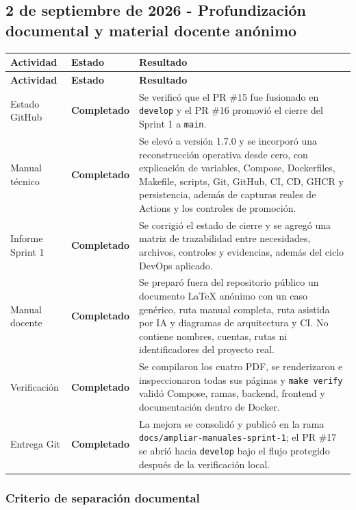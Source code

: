 \documentclass[11pt,letterpaper]{article}
\newcommand{\statusok}{\textcolor{deepgreen}{\textbf{Completado}}}
\newcommand{\file}[1]{\texttt{#1}}
\begin{document}
\subsection{2 de septiembre de 2026 - Profundización documental y material docente anónimo}

\begin{longtable}{@{}p{}p{}p{}@{}}
  \toprule
  \textbf{Actividad} & \textbf{Estado} & \textbf{Resultado} \\
  \midrule
  \endfirsthead
  \toprule
  \textbf{Actividad} & \textbf{Estado} & \textbf{Resultado} \\
  \midrule
  \endhead
  Estado GitHub & \statusok & Se verificó que el PR \#15 fue fusionado en \file{develop} y el PR \#16 promovió el cierre del Sprint 1 a \file{main}. \\
  Manual técnico & \statusok & Se elevó a versión 1.7.0 y se incorporó una reconstrucción operativa desde cero, con explicación de variables, Compose, Dockerfiles, Makefile, scripts, Git, GitHub, CI, CD, GHCR y persistencia, además de capturas reales de Actions y los controles de promoción. \\
  Informe Sprint 1 & \statusok & Se corrigió el estado de cierre y se agregó una matriz de trazabilidad entre necesidades, archivos, controles y evidencias, además del ciclo DevOps aplicado. \\
  Manual docente & \statusok & Se preparó fuera del repositorio público un documento LaTeX anónimo con un caso genérico, ruta manual completa, ruta asistida por IA y diagramas de arquitectura y CI. No contiene nombres, cuentas, rutas ni identificadores del proyecto real. \\
  Verificación & \statusok & Se compilaron los cuatro PDF, se renderizaron e inspeccionaron todas sus páginas y \file{make verify} validó Compose, ramas, backend, frontend y documentación dentro de Docker. \\
  Entrega Git & \statusok & La mejora se consolidó y publicó en la rama \file{docs/ampliar-manuales-sprint-1}; el PR \#17 se abrió hacia \file{develop} bajo el flujo protegido después de la verificación local. \\
  \bottomrule
\end{longtable}

\subsubsection{Criterio de separación documental}
\end{document}
